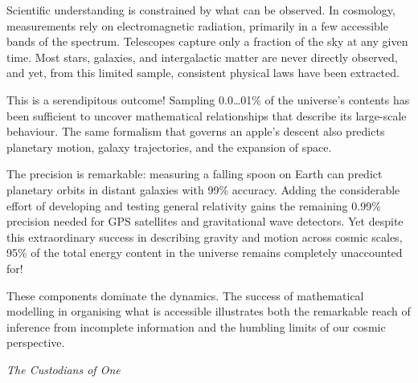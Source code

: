 \begin{commentary}
Scientific understanding is constrained by what can be observed. In cosmology, measurements rely on electromagnetic radiation, primarily in a few accessible bands of the spectrum. Telescopes capture only a fraction of the sky at any given time. Most stars, galaxies, and intergalactic matter are never directly observed, and yet, from this limited sample, consistent physical laws have been extracted.

This is a serendipitous outcome! Sampling 0.0\ldots01\% of the universe's contents has been sufficient to uncover mathematical relationships that describe its large-scale behaviour. The same formalism that governs an apple's descent also predicts planetary motion, galaxy trajectories, and the expansion of space.

The precision is remarkable: measuring a falling spoon on Earth can predict planetary orbits in distant galaxies with 99\% accuracy. Adding the considerable effort of developing and testing general relativity gains the remaining 0.99\% precision needed for GPS satellites and gravitational wave detectors. Yet despite this extraordinary success in describing gravity and motion across cosmic scales, 95\% of the total energy content in the universe remains completely unaccounted for!

These components dominate the dynamics. The success of mathematical modelling in organising what is accessible illustrates both the remarkable reach of inference from incomplete information and the humbling limits of our cosmic perspective.

\end{commentary}

\newpage
\thispagestyle{empty}

\begin{center}
\vspace*{0.25cm}
{\Large\textit{The Custodians of One}}
\vspace{0.25cm}
\end{center}

